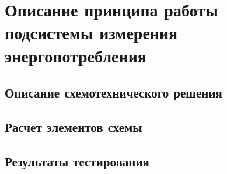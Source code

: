 \chapter{Описание принципа работы подсистемы измерения энергопотребления}
\section{Описание схемотехнического решения}
\hspace{1cm} 


\section{Расчет элементов схемы}
\hspace{1cm} 

\section{Результаты тестирования}
\hspace{1cm} 